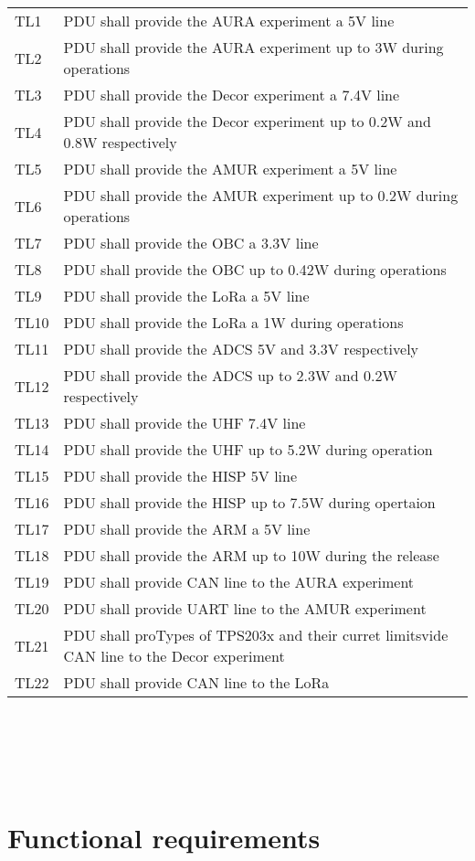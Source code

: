 \begin{tabular}{p{1cm}p{15cm}}
TL1 & PDU shall provide the AURA experiment a 5V line\\
TL2 & PDU shall provide the AURA experiment up to 3W during operations\\
TL3 & PDU shall provide the Decor experiment a 7.4V line\\
TL4 & PDU shall provide the Decor experiment up to 0.2W and 0.8W respectively\\
TL5 & PDU shall provide the AMUR experiment a 5V line\\
TL6 & PDU shall provide the AMUR experiment up to 0.2W during operations\\
TL7 & PDU shall provide the OBC a 3.3V line\\
TL8 & PDU shall provide the OBC up to 0.42W during operations\\
TL9 & PDU shall provide the LoRa a 5V line\\
TL10 & PDU shall provide the LoRa a 1W during operations\\
TL11 & PDU shall provide the ADCS 5V and 3.3V respectively\\
TL12 & PDU shall provide the ADCS up to 2.3W and 0.2W respectively\\
TL13 & PDU shall provide the UHF 7.4V line\\
TL14 & PDU shall provide the UHF up to 5.2W during operation\\
TL15 & PDU shall provide the HISP 5V line\\
TL16 & PDU shall provide the HISP up to 7.5W during opertaion\\
TL17 & PDU shall provide the ARM a 5V line\\
TL18 & PDU shall provide the ARM up to 10W during the release\\ 
TL19 & PDU shall provide CAN line to the AURA experiment\\
TL20 & PDU shall provide UART line to the AMUR experiment\\
TL21 & PDU shall proTypes of TPS203x and their curret limitsvide CAN line to the Decor experiment\\
TL22 & PDU shall provide CAN line to the LoRa\\
\bottomrule
\end{tabular}\\ \\ \\ \\
\label{Tab:req1}



\section{Functional requirements}

